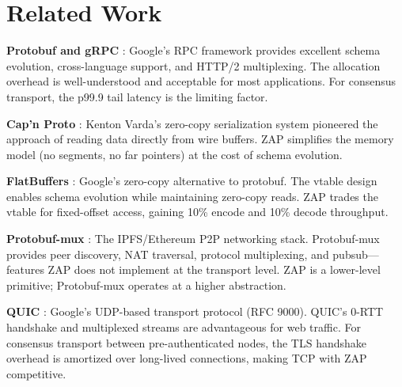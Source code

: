 \section{Related Work}


\textbf{Protobuf and gRPC} \cite{grpc}: Google's RPC framework provides excellent schema evolution, cross-language support, and HTTP/2 multiplexing. The allocation overhead is well-understood \cite{protobuf} and acceptable for most applications. For consensus transport, the p99.9 tail latency is the limiting factor.

\textbf{Cap'n Proto} \cite{capnp}: Kenton Varda's zero-copy serialization system pioneered the approach of reading data directly from wire buffers. ZAP simplifies the memory model (no segments, no far pointers) at the cost of schema evolution.

\textbf{FlatBuffers} \cite{flatbuf}: Google's zero-copy alternative to protobuf. The vtable design enables schema evolution while maintaining zero-copy reads. ZAP trades the vtable for fixed-offset access, gaining 10\% encode and 10\% decode throughput.

\textbf{Protobuf-mux} \cite{Protobuf-mux}: The IPFS/Ethereum P2P networking stack. Protobuf-mux provides peer discovery, NAT traversal, protocol multiplexing, and pubsub---features ZAP does not implement at the transport level. ZAP is a lower-level primitive; Protobuf-mux operates at a higher abstraction.

\textbf{QUIC} \cite{quic}: Google's UDP-based transport protocol (RFC 9000). QUIC's 0-RTT handshake and multiplexed streams are advantageous for web traffic. For consensus transport between pre-authenticated nodes, the TLS handshake overhead is amortized over long-lived connections, making TCP with ZAP competitive.

